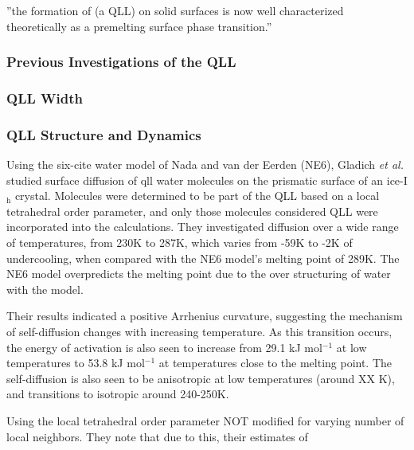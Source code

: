 ''the formation of (a QLL) on solid surfaces is now well characterized
theoretically as a premelting surface phase
transition.''\cite{R. Lipowsky, Phys. Rev. Lett. 49, 1575 (1982).}

\subsubsection{Previous Investigations of the QLL}
\subsubsection{QLL Width}
\subsubsection{QLL Structure and Dynamics}

Using the six-cite water model of Nada and van der Eerden (NE6),
Gladich \textit{et al.} studied surface diffusion of qll water
molecules on the prismatic surface of an ice-I$_\mathrm{h}$
crystal.\cite{Gladich11} Molecules were determined to be part of the
QLL based on a local tetrahedral order parameter, and only those
molecules considered QLL were incorporated into the calculations. They
investigated diffusion over a wide range of temperatures, from 230K to
287K, which varies from -59K to -2K of undercooling, when compared
with the NE6 model's melting point of 289K. The NE6 model overpredicts
the melting point due to the over structuring of water with the model.

Their results indicated a positive Arrhenius curvature, suggesting the
mechanism of self-diffusion changes with increasing temperature. As
this transition occurs, the energy of activation is also seen to
increase from 29.1 kJ mol$^{-1}$ at low temperatures to 53.8 kJ
mol$^{-1}$ at temperatures close to the melting point. The
self-diffusion is also seen to be anisotropic at low temperatures
(around XX K), and transitions to isotropic around 240-250K. 

Using the local tetrahedral order parameter NOT modified for varying
number of local neighbors. They note that due to this, their estimates
of 

